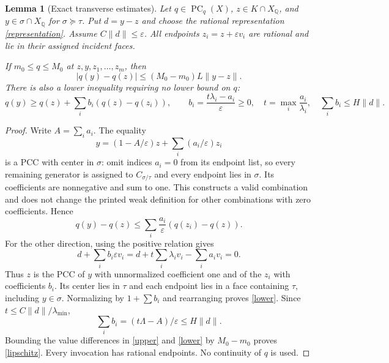 \documentclass[11pt]{article}
\newtheorem{lemma}[theorem]{Lemma}
\newcommand{\Q}{\mathbb Q}
\newcommand{\PC}{\operatorname{PC}}
\begin{document}
\begin{lemma}[Exact transverse estimates]\label{estimates}
Let $q\in\PC_q(X)$, $z\in K\cap X_\Q$, and $y\in\sigma\cap X_\Q$ for $\sigma\succeq\tau$. Put $d=y-z$ and choose the rational representation \eqref{representation}. Assume $C\|d\|\leq\varepsilon$. All endpoints $z_i=z+\varepsilon v_i$ are rational and lie in their assigned incident faces.

If $m_0\leq q\leq M_0$ at $z,y,z_1,\ldots,z_m$, then
\begin{equation}\label{lipschitz}
 |q(y)-q(z)|\leq (M_0-m_0)L\|y-z\|.
\end{equation}
There is also a lower inequality requiring no lower bound on $q$:
\begin{equation}\label{lower}
 q(y)\geq q(z)+\sum_i b_i(q(z)-q(z_i)),\qquad
 b_i=\frac{t\lambda_i-a_i}{\varepsilon}\geq0,\quad
 t=\max_i\frac{a_i}{\lambda_i},\quad \sum_i b_i\leq H\|d\|.
\end{equation}
\end{lemma}
\begin{proof}
Write $A=\sum_i a_i$. The equality
\[y=(1-A/\varepsilon)z+\sum_i(a_i/\varepsilon)z_i\]
is a PCC with center in $\sigma$: omit indices $a_i=0$ from its endpoint list, so every remaining generator is assigned to $C_{\sigma/\tau}$ and every endpoint lies in $\sigma$. Its coefficients are nonnegative and sum to one. This constructs a valid combination and does not change the printed weak definition for other combinations with zero coefficients. Hence
\begin{equation}\label{upper}
 q(y)-q(z)\leq\sum_i\frac{a_i}{\varepsilon}(q(z_i)-q(z)).
\end{equation}
For the other direction, using the positive relation gives
\[d+\sum_i b_i\varepsilon v_i=d+t\sum_i\lambda_i v_i-\sum_i a_i v_i=0.
\]
Thus $z$ is the PCC of $y$ with unnormalized coefficient one and of the $z_i$ with coefficients $b_i$. Its center lies in $\tau$ and each endpoint lies in a face containing $\tau$, including $y\in\sigma$. Normalizing by $1+\sum b_i$ and rearranging proves \eqref{lower}. Since $t\leq C\|d\|/\lambda_{\min}$,
\[\sum_i b_i=(t\Lambda-A)/\varepsilon\leq H\|d\|.\]
Bounding the value differences in \eqref{upper} and \eqref{lower} by $M_0-m_0$ proves \eqref{lipschitz}. Every invocation has rational endpoints. No continuity of $q$ is used.
\end{proof}
\end{document}
